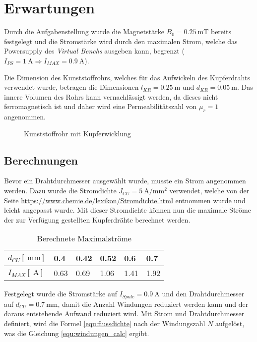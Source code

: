 \documentclass[../main.tex]{subfiles}
\begin{document}
\section{Erwartungen}

Durch die Aufgabenstellung wurde die Magnetstärke $B_0 = \SI{0.25}{\milli\tesla}$ bereits festgelegt und die Stromstärke wird durch den maximalen Strom, welche das Powersupply des \textit{Virtual Benchs} ausgeben kann, begrenzt ($I_{PS} = \SI{1}{\ampere} \Rightarrow I_{MAX} = \SI{0.9}{\ampere}$).

Die Dimension des Kunststoffrohrs, welches für das Aufwickeln des Kupferdrahts verwendet wurde, betragen die Dimensionen $l_{KR} = \SI{0.25}{\metre}$ und $d_{KR} = \SI{0.05}{\metre}$. Das innere Volumen des Rohrs kann vernachlässigt werden, da dieses nicht ferromagnetisch ist und daher wird eine Permeabilitätszahl von ${\mu}_r = 1$ angenommen.

\begin{figure}[h]
  \centering
    
    \caption{Kunststoffrohr mit Kupferwicklung}
  \label{expect_pipe_infos}
\end{figure}

\subsection{Berechnungen}

Bevor ein Drahtdurchmesser ausgewählt wurde, musste ein Strom angenommen werden. Dazu wurde die Stromdichte $J_{CU} = \SI{5}{\ampere\per\milli\meter^2}$ verwendet, welche von der Seite \url{https://www.chemie.de/lexikon/Stromdichte.html} entnommen wurde und leicht angepasst wurde. Mit dieser Stromdichte können nun die maximale Ströme der zur Verfügung gestellten Kupferdrähte berechnet werden.

\begin{table}[h]
  \centering
  \def\arraystretch{1.5}
  \begin{tabular}{l|lllll}
  $d_{CU} [\SI[parse-numbers = false]{}{\milli\metre}]$ & 0.4  & 0.42 & 0.52 & 0.6  & 0.7  \\ \hline
  $I_{MAX} [\SI[parse-numbers = false]{}{\ampere}]$ & 0.63 & 0.69 & 1.06 & 1.41 & 1.92
  \end{tabular}
  \caption{Berechnete Maximalströme}
  \label{tab:max_current}
\end{table}

Festgelegt wurde die Stromstärke auf $I_{Spule} = \SI{0.9}{\ampere}$ und den Drahtdurchmesser auf $d_{CU} = \SI{0.7}{\milli\metre}$, damit die Anzahl Windungen reduziert werden kann und der daraus entstehende Aufwand reduziert wird. Mit Strom und Drahtdurchmesser definiert, wird die Formel \ref{equ:flussdichte} nach der Windungszahl $N$ aufgelöst, was die Gleichung \ref{equ:windungen_calc} ergibt.
\end{document}
